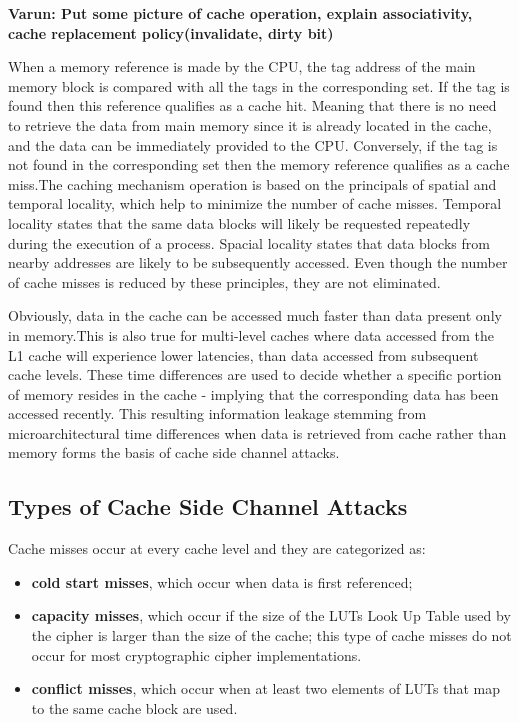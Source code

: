 \documentclass[twocolumn]{IEEEtran}
\begin{document}
{\bf Varun: Put some picture of cache operation, explain associativity, cache replacement policy(invalidate, dirty bit)}

When a memory reference is made by the CPU, the tag address of the main memory block is compared with all the tags in the corresponding set. If the tag is found then this reference qualifies as a cache hit. Meaning that there is no need to retrieve the data from main memory since it is already located in the cache, and the data can be immediately provided to the CPU. Conversely, if the tag is not found in the corresponding set then the memory reference qualifies as a cache miss.The caching mechanism operation is based on the principals of spatial and temporal locality, which help to minimize the number of
cache misses. Temporal locality states that the same data blocks will likely be requested repeatedly during the execution of a process. Spacial locality states that data blocks from nearby addresses are likely to be subsequently accessed. Even though the number of cache
misses is reduced by these principles, they are not eliminated.

Obviously, data in the cache can be accessed much faster than data present only in memory.This is also true for multi-level caches where data accessed from the L1 cache will experience lower latencies, than data accessed from subsequent cache levels. These time differences are used to decide whether a specific portion of memory resides in the cache - implying that the corresponding data has been accessed recently. This resulting information leakage stemming from microarchitectural time differences when data is retrieved from cache rather than memory forms the basis of cache side channel attacks.

\subsection { Types of Cache Side Channel Attacks }

Cache misses occur at every cache level and they are categorized as:

\begin {itemize}
\item \textbf{cold start misses}, which occur when data is first referenced;
\item \textbf{capacity misses}, which occur if the size of the LUTs Look Up Table used by the cipher is larger than the size of the cache; this type of cache misses do not occur for most cryptographic cipher implementations.
\item \textbf{conflict misses}, which occur when at least two elements of LUTs that map to the same cache block are used.
\end {itemize}
\end{document}
